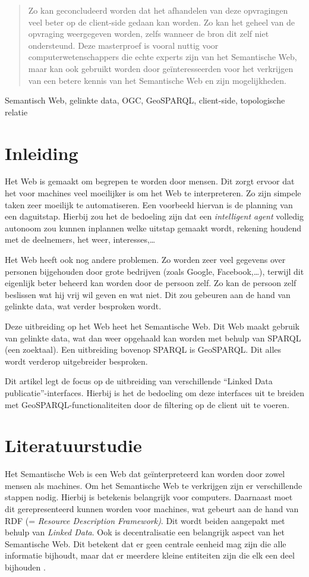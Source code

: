 \documentclass[twocolumn]{phdsymp} %
\begin{document}
\begin{abstract}
    Zo kan geconcludeerd worden dat het afhandelen van deze opvragingen veel beter op de client-side gedaan kan worden. Zo kan het geheel van de opvraging weergegeven worden, zelfs wanneer de bron dit zelf niet ondersteund. Deze masterproef is vooral nuttig voor computerwetenschappers die echte experts zijn van het Semantische Web, maar kan ook gebruikt worden door geïnteresseerden voor het verkrijgen van een betere kennis van het Semantische Web en zijn mogelijkheden.
\end{abstract}

\begin{keywords}
    Semantisch Web, gelinkte data, OGC, GeoSPARQL, client-side, topologische relatie
\end{keywords}

\section{Inleiding}
Het Web is gemaakt om begrepen te worden door mensen. Dit zorgt ervoor dat het voor machines veel moeilijker is om het Web te interpreteren. Zo zijn simpele taken zeer moeilijk te automatiseren. Een voorbeeld hiervan is de planning van een daguitstap. Hierbij zou het de bedoeling zijn dat een \textit{intelligent agent} volledig autonoom zou kunnen inplannen welke uitstap gemaakt wordt, rekening houdend met de deelnemers, het weer, interesses,\dots 

Het Web heeft ook nog andere problemen. Zo worden zeer veel gegevens over personen bijgehouden door grote bedrijven (zoals Google, Facebook,\dots), terwijl dit eigenlijk beter beheerd kan worden door de persoon zelf. Zo kan de persoon zelf beslissen wat hij vrij wil geven en wat niet. Dit zou gebeuren aan de hand van gelinkte data, wat verder besproken wordt.

Deze uitbreiding op het Web heet het Semantische Web. Dit Web maakt gebruik van gelinkte data, wat dan weer opgehaald kan worden met behulp van SPARQL (een zoektaal). Een uitbreiding bovenop SPARQL is GeoSPARQL. Dit alles wordt verderop uitgebreider besproken.

Dit artikel legt de focus op de uitbreiding van verschillende ``Linked Data publicatie''-interfaces. Hierbij is het de bedoeling om deze interfaces uit te breiden met GeoSPARQL-functionaliteiten door de filtering op de client uit te voeren.

\section{Literatuurstudie}
Het Semantische Web is een Web dat geïnterpreteerd kan worden door zowel mensen als machines. Om het Semantische Web te verkrijgen zijn er verschillende stappen nodig. Hierbij is betekenis belangrijk voor computers. Daarnaast moet dit gerepresenteerd kunnen worden voor machines, wat gebeurt aan de hand van RDF (= \textit{Resource Description Framework)}. Dit wordt beiden aangepakt met behulp van \textit{Linked Data}. Ook is decentralisatie een belangrijk aspect van het Semantische Web. Dit betekent dat er geen centrale eenheid mag zijn die alle informatie bijhoudt, maar dat er meerdere kleine entiteiten zijn die elk een deel bijhouden \cite{berners2001semantic}.
\end{document}
